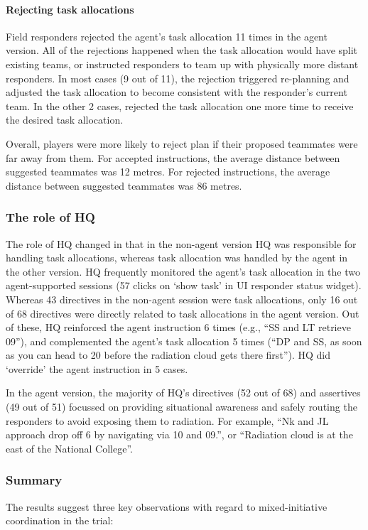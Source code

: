 \paragraph{Rejecting task allocations}

Field responders rejected the agent's task allocation 11 times in the agent version. All of the rejections happened when the task allocation would have split existing teams, or instructed responders to team up with physically more distant responders. In most cases (9 out of 11), the rejection triggered re-planning and adjusted the task allocation to become consistent with the responder's current team. In the other 2 cases, rejected the task allocation one more time to receive the desired task allocation. 

Overall, players were more likely to reject plan if their proposed teammates were far away from them. For accepted instructions, the average distance between suggested teammates was 12 metres. For rejected instructions, the average distance between suggested teammates was 86 metres.

\subsubsection{The role of HQ}
The role of HQ changed in that in the non-agent version HQ was responsible for handling task allocations, whereas task allocation was handled by the agent in the other version. HQ frequently monitored the agent's task allocation in the two agent-supported sessions (57 clicks on `show task' in UI responder status widget). Whereas 43 directives in the non-agent session were task allocations, only 16 out of 68 directives were directly related to task allocations in the agent version. Out of these, HQ reinforced the agent instruction 6 times (e.g., ``SS and LT retrieve 09''), and complemented the agent's task allocation 5 times (``DP and SS, as soon as you can head to 20 before the radiation cloud gets there first''). HQ did `override' the agent instruction in 5 cases.  

In the agent version, the majority of HQ's directives (52 out of 68) and assertives (49 out of 51) focussed on providing situational awareness and safely routing the responders to avoid exposing them to radiation. For example, ``Nk and JL approach drop off 6 by navigating via 10 and 09.'', or ``Radiation cloud is at the east of the National College''. 

\subsubsection{Summary}
The results suggest three key observations with regard to mixed-initiative coordination in the trial:

